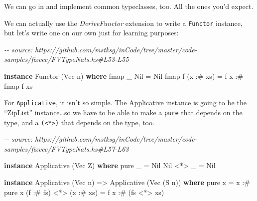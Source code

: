 \documentclass[]{article}
\newenvironment{Shaded}{}{}
\newcommand{\CommentTok}[1]{\textcolor[rgb]{0.38,0.63,0.69}{\textit{#1}}}
\newcommand{\DataTypeTok}[1]{\textcolor[rgb]{0.56,0.13,0.00}{#1}}
\newcommand{\FunctionTok}[1]{\textcolor[rgb]{0.02,0.16,0.49}{#1}}
\newcommand{\KeywordTok}[1]{\textcolor[rgb]{0.00,0.44,0.13}{\textbf{#1}}}
\newcommand{\NormalTok}[1]{#1}
\newcommand{\OperatorTok}[1]{\textcolor[rgb]{0.40,0.40,0.40}{#1}}
\newcommand{\OtherTok}[1]{\textcolor[rgb]{0.00,0.44,0.13}{#1}}
\begin{document}
We can go in and implement common typeclasses, too. All the ones you'd expect.

We can actually use the \emph{DeriveFunctor} extension to write a
\texttt{Functor} instance, but let's write one on our own just for learning
purposes:

\begin{Shaded}
\begin{Highlighting}[]
\CommentTok{{-}{-} source: https://github.com/mstksg/inCode/tree/master/code{-}samples/fixvec/FVTypeNats.hs\#L53{-}L55}

\KeywordTok{instance} \DataTypeTok{Functor}\NormalTok{ (}\DataTypeTok{Vec}\NormalTok{ n) }\KeywordTok{where}
    \FunctionTok{fmap}\NormalTok{ \_ }\DataTypeTok{Nil}       \OtherTok{=} \DataTypeTok{Nil}
    \FunctionTok{fmap}\NormalTok{ f (x }\OperatorTok{:\#}\NormalTok{ xs) }\OtherTok{=}\NormalTok{ f x }\OperatorTok{:\#} \FunctionTok{fmap}\NormalTok{ f xs}
\end{Highlighting}
\end{Shaded}

For \texttt{Applicative}, it isn't so simple. The Applicative instance is going
to be the ``ZipList'' instance\ldots so we have to be able to make a
\texttt{pure} that depends on the type, and a
\texttt{(\textless{}*\textgreater{})} that depends on the type, too.

\begin{Shaded}
\begin{Highlighting}[]
\CommentTok{{-}{-} source: https://github.com/mstksg/inCode/tree/master/code{-}samples/fixvec/FVTypeNats.hs\#L57{-}L63}

\KeywordTok{instance} \DataTypeTok{Applicative}\NormalTok{ (}\DataTypeTok{Vec} \DataTypeTok{Z}\NormalTok{) }\KeywordTok{where}
    \FunctionTok{pure}\NormalTok{ \_    }\OtherTok{=} \DataTypeTok{Nil}
    \DataTypeTok{Nil} \OperatorTok{\textless{}*\textgreater{}}\NormalTok{ \_ }\OtherTok{=} \DataTypeTok{Nil}

\KeywordTok{instance} \DataTypeTok{Applicative}\NormalTok{ (}\DataTypeTok{Vec}\NormalTok{ n) }\OtherTok{=\textgreater{}} \DataTypeTok{Applicative}\NormalTok{ (}\DataTypeTok{Vec}\NormalTok{ (}\DataTypeTok{S}\NormalTok{ n)) }\KeywordTok{where}
    \FunctionTok{pure}\NormalTok{ x }\OtherTok{=}\NormalTok{ x }\OperatorTok{:\#} \FunctionTok{pure}\NormalTok{ x}
\NormalTok{    (f }\OperatorTok{:\#}\NormalTok{ fs) }\OperatorTok{\textless{}*\textgreater{}}\NormalTok{ (x }\OperatorTok{:\#}\NormalTok{ xs) }\OtherTok{=}\NormalTok{ f x }\OperatorTok{:\#}\NormalTok{ (fs }\OperatorTok{\textless{}*\textgreater{}}\NormalTok{ xs)}
\end{Highlighting}
\end{Shaded}
\end{document}
